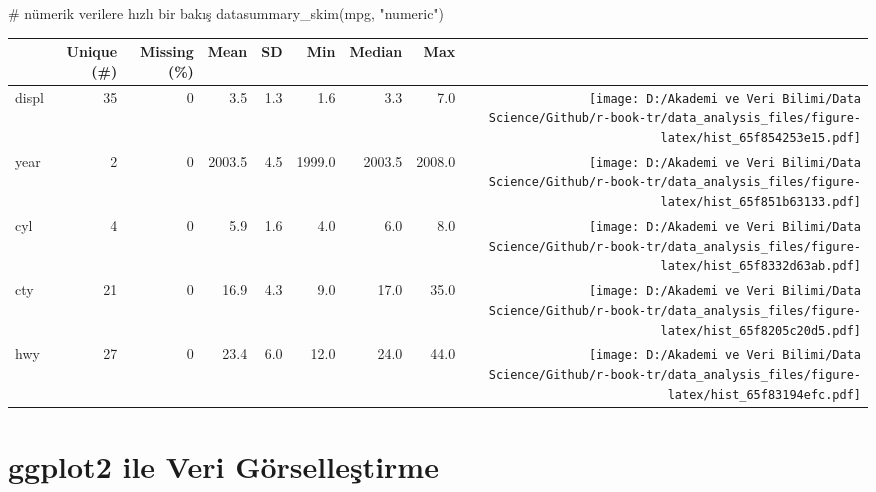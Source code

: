 \documentclass[
  letterpaper,
  DIV=11,
  numbers=noendperiod]{scrreprt}
\newenvironment{Shaded}{\begin{snugshade}}{\end{snugshade}}
\newcommand{\CommentTok}[1]{\textcolor[rgb]{0.37,0.37,0.37}{#1}}
\newcommand{\FunctionTok}[1]{\textcolor[rgb]{0.28,0.35,0.67}{#1}}
\newcommand{\NormalTok}[1]{\textcolor[rgb]{0.00,0.23,0.31}{#1}}
\newcommand{\StringTok}[1]{\textcolor[rgb]{0.13,0.47,0.30}{#1}}
\begin{document}
\begin{Shaded}
\begin{Highlighting}[]
\CommentTok{\# nümerik verilere hızlı bir bakış}
\FunctionTok{datasummary\_skim}\NormalTok{(mpg, }\StringTok{"numeric"}\NormalTok{)}
\end{Highlighting}
\end{Shaded}

\begin{table}
\centering
\begin{tabular}[t]{lrrrrrrr>{}r}
\toprule
  & Unique (\#) & Missing (\%) & Mean & SD & Min & Median & Max &   \\
\midrule
displ & 35 & 0 & \num{3.5} & \num{1.3} & \num{1.6} & \num{3.3} & \num{7.0} & \texttt{[image: D:/Akademi ve Veri Bilimi/Data Science/Github/r-book-tr/data\_analysis\_files/figure-latex/hist\_65f854253e15.pdf]}\\
year & 2 & 0 & \num{2003.5} & \num{4.5} & \num{1999.0} & \num{2003.5} & \num{2008.0} & \texttt{[image: D:/Akademi ve Veri Bilimi/Data Science/Github/r-book-tr/data\_analysis\_files/figure-latex/hist\_65f851b63133.pdf]}\\
cyl & 4 & 0 & \num{5.9} & \num{1.6} & \num{4.0} & \num{6.0} & \num{8.0} & \texttt{[image: D:/Akademi ve Veri Bilimi/Data Science/Github/r-book-tr/data\_analysis\_files/figure-latex/hist\_65f8332d63ab.pdf]}\\
cty & 21 & 0 & \num{16.9} & \num{4.3} & \num{9.0} & \num{17.0} & \num{35.0} & \texttt{[image: D:/Akademi ve Veri Bilimi/Data Science/Github/r-book-tr/data\_analysis\_files/figure-latex/hist\_65f8205c20d5.pdf]}\\
hwy & 27 & 0 & \num{23.4} & \num{6.0} & \num{12.0} & \num{24.0} & \num{44.0} & \texttt{[image: D:/Akademi ve Veri Bilimi/Data Science/Github/r-book-tr/data\_analysis\_files/figure-latex/hist\_65f83194efc.pdf]}\\
\bottomrule
\end{tabular}
\end{table}


\chapter*{ggplot2 ile Veri
Görselleştirme}\label{ggplot2-ile-veri-guxf6rselleux15ftirme}

\end{document}
